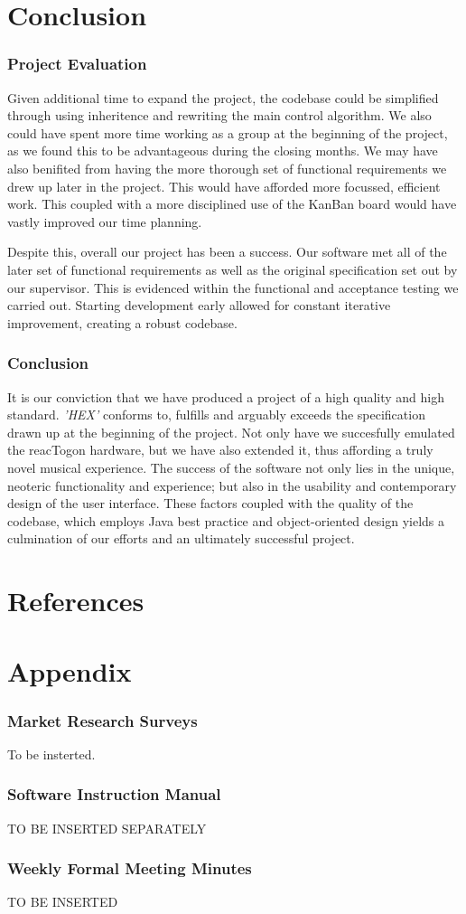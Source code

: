 \documentclass[10pt,a4paper]{article}
\begin{document}
\pagebreak
\part{Conclusion}
\section{Project Evaluation}
Given additional time to expand the project, the codebase could be simplified through using inheritence and rewriting the main control algorithm. We also could have spent more time working as a group at the beginning of the project, as we found this to be advantageous during the closing months. We may have also benifited from having the more thorough set of functional requirements we drew up later in the project. This would have afforded more focussed, efficient work. This coupled with a more disciplined use of the KanBan board would have vastly improved our time planning.

Despite this, overall our project has been a success. Our software met all of the later set of functional requirements as well as the original specification set out by our supervisor. This is evidenced within the functional and acceptance testing we carried out. Starting development early allowed for constant iterative improvement, creating a robust codebase.

\section{Conclusion}
It is our conviction that we have produced a project of a high quality and high standard. \textit{'HEX'} conforms to, fulfills and arguably exceeds the specification drawn up at the beginning of the project. Not only have we succesfully emulated the reacTogon hardware, but we have also extended it, thus affording a truly novel musical experience. The success of the software not only lies in the unique, neoteric functionality and experience; but also in the usability and contemporary design of the user interface. These factors coupled with the quality of the codebase, which employs Java best practice and object-oriented design yields a culmination of our efforts and an ultimately successful project.

\pagebreak
\part{References}


\pagebreak

\part{Appendix}
\section{Market Research Surveys}
To be insterted.
\pagebreak

\section{Software Instruction Manual}
TO BE INSERTED SEPARATELY

\pagebreak
\section{Weekly Formal Meeting Minutes}
TO BE INSERTED
\end{document}
